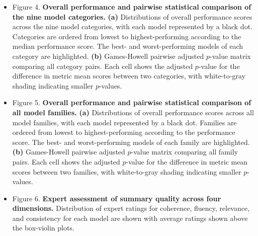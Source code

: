 \begin{itemize}
	\item Figure 4. \textbf{Overall performance and pairwise statistical comparison of the nine model categories.} \textbf{(a)} Distributions of overall performance scores across the nine model categories, with each model represented by a black dot. Categories are ordered from lowest to highest-performing according to the median performance score. The best- and worst-performing models of each category are highlighted. \textbf{(b)} Games-Howell pairwise adjusted $p$-value matrix comparing all category pairs. Each cell shows the adjusted $p$-value for the difference in metric mean scores between two categories, with white-to-gray shading indicating smaller $p$-values.
	\item Figure 5. \textbf{Overall performance and pairwise statistical comparison of all model families.} \textbf{(a)} Distributions of overall performance scores across all model families, with each model represented by a black dot. Families are ordered from lowest to highest-performing according to the performance score. The best- and worst-performing models of each family are highlighted. \textbf{(b)} Games-Howell pairwise adjusted $p$-value matrix comparing all family pairs. Each cell shows the adjusted $p$-value for the difference in metric mean scores between two families, with white-to-gray shading indicating smaller $p$-values.
	\item Figure 6. \textbf{Expert assessment of summary quality across four dimensions.} Distribution of expert ratings for coherence, fluency, relevance, and consistency for each model are shown with average ratings shown above the box-violin plots.
\end{itemize}
